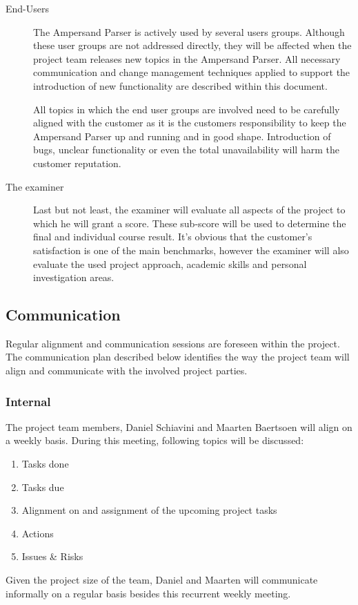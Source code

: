 \begin{description}
	\item[End-Users]
	The Ampersand Parser is actively used by several users groups.
	Although these user groups are not addressed directly, they will be affected when the project team releases new topics in the Ampersand Parser.
	All necessary communication and change management techniques applied to support the introduction of new functionality are described within this document.

	All topics in which the end user groups are involved need to be carefully aligned with the customer as it is the customers responsibility to keep the Ampersand Parser up and running and in good shape.
	Introduction of bugs, unclear functionality or even the total unavailability will harm the customer reputation.

	\item[The examiner]
	Last but not least, the examiner will evaluate all aspects of the project to which he will grant a score.
	These sub-score will be used to determine the final and individual course result.
	It's obvious that the customer's satisfaction is one of the main benchmarks, however the examiner will also evaluate the used project approach, academic skills and personal investigation areas.
\end {description}

\subsection{Communication}
\label{subsec:communication}
Regular alignment and communication sessions are foreseen within the project.
The communication plan described below identifies the way the project team will align and communicate with the involved project parties.

\subsubsection{Internal}
The project team members, Daniel Schiavini and Maarten Baertsoen will align on a weekly basis.
During this meeting, following topics will be discussed:
\begin{enumerate}
	\item Tasks done
	\item Tasks due
	\item Alignment on and assignment of the upcoming project tasks
	\item Actions
	\item Issues \& Risks
\end {enumerate}
%
Given the project size of the team, Daniel and Maarten will communicate informally on a regular basis besides this recurrent weekly meeting.

